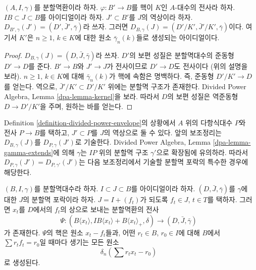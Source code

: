 \begin{lemma}
\label{lemma-divided-power-envelop-quotient}
$(A, I, \gamma)$를 분할멱환이라 하자.
$\varphi : B' \to B$를 핵이 $K$인 $A$-대수의 전사라 하자.
$IB \subset J \subset B$를 아이디얼이라 하자. $J' \subset B'$를
$J$의 역상이라 하자.
$D_{B', \gamma}(J') = (D', \bar J', \bar\gamma)$라 쓰자.
그러면 $D_{B, \gamma}(J) = (D'/K', \bar J'/K', \bar\gamma)$이다.
여기서 $K'$은 $n \geq 1$, $k \in K$에 대한 원소
$\bar\gamma_n(k)$들로 생성되는 아이디얼이다.
\end{lemma}

\begin{proof}
$D_{B, \gamma}(J) = (D, \bar J, \bar \gamma)$라 쓰자.
$D'$의 보편 성질은 분할멱대수의 준동형 $D' \to D$를 준다.
$B' \to B$와 $J' \to J$가 전사이므로 $D' \to D$도 전사이다
(위의 설명을 보라). $n \geq 1$, $k \in K$에 대해
$\bar\gamma_n(k)$가 핵에 속함은 명백하다. 즉, 준동형
$D'/K' \to D$를 얻는다. 역으로, $\bar J'/K' \subset D'/K'$ 위에는
분할멱 구조가 존재한다. Divided Power Algebra, Lemma
\ref{dpa-lemma-kernel}을 보라.
따라서 $D$의 보편 성질은 역준동형 $D \to D'/K'$을 주며, 원하는 바를 얻는다.
\end{proof}

\noindent
Definition \ref{definition-divided-power-envelope}의 상황에서 $A$ 위의
다항식대수 $P$와 전사 $P \to B$를 택하고, $J' \subset P$를 $J$의
역상으로 둘 수 있다. 앞의 보조정리는 $D_{B, \gamma}(J)$를
$D_{P, \gamma}(J')$로 기술한다. Divided Power Algebra, Lemma
\ref{dpa-lemma-gamma-extends}에 의해 $\gamma$는 $IP$ 위의 분할멱 구조
$\gamma'$으로 확장됨에 유의하라. 따라서
$D_{P, \gamma}(J') = D_{P, \gamma'}(J')$는 다음 보조정리에서 기술할
분할멱 포락의 특수한 경우에 해당한다.

\begin{lemma}
\label{lemma-describe-divided-power-envelope}
$(B, I, \gamma)$를 분할멱대수라 하자. $I \subset J \subset B$를
아이디얼이라 하자. $(D, \bar J, \bar \gamma)$를 $\gamma$에 대한
$J$의 분할멱 포락이라 하자. $J = I + (f_t)$가 되도록
$f_t \in J$, $t \in T$를 택하자. 그러면 $x_t$를 $D$에서의 $f_t$의
상으로 보내는 분할멱환의 전사
$$
\Psi :
(B\langle x_t \rangle, IB\langle x_t \rangle + B\langle x_t \rangle_+, \delta)
\longrightarrow
(D, \bar J, \bar \gamma)
$$
가 존재한다. $\Psi$의 핵은 원소 $x_t - f_t$들과, 어떤
$r_t \in B$, $r_0 \in I$에 대해 $B$에서 $\sum r_t f_t = r_0$일 때마다
생기는 모든 원소
$$
\delta_n\left(\sum r_t x_t - r_0\right)
$$
로 생성된다.
\end{lemma}

